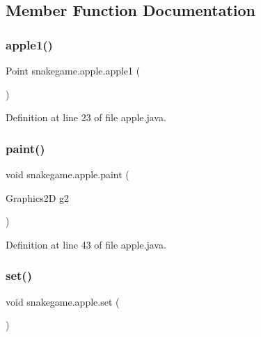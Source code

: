 \subsection{Member Function Documentation}
\mbox{\label{classsnakegame_1_1apple_a2a93c78385af6c64271ce163dd883712}} 
\subsubsection{\texorpdfstring{apple1()}{apple1()}}
{\footnotesize\ttfamily Point snakegame.\+apple.\+apple1 (\begin{DoxyParamCaption}{ }\end{DoxyParamCaption})}



Definition at line 23 of file apple.\+java.

\mbox{\label{classsnakegame_1_1apple_a3a6294f277af9a64dea186eb41583b97}} 
\subsubsection{\texorpdfstring{paint()}{paint()}}
{\footnotesize\ttfamily void snakegame.\+apple.\+paint (\begin{DoxyParamCaption}\item[{Graphics2D}]{g2 }\end{DoxyParamCaption})}



Definition at line 43 of file apple.\+java.

\mbox{\label{classsnakegame_1_1apple_af5cab740833aef8650ef374868585930}} 
\subsubsection{\texorpdfstring{set()}{set()}\hspace{0.1cm}{\footnotesize\ttfamily [1/3]}}
{\footnotesize\ttfamily void snakegame.\+apple.\+set (\begin{DoxyParamCaption}{ }\end{DoxyParamCaption})}



